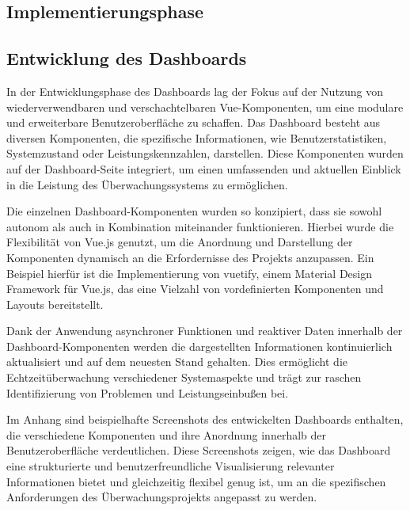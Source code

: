 \begin{flushleft}
	\section{Implementierungsphase}


		\subsection{Entwicklung des Dashboards}
			In der Entwicklungsphase des Dashboards lag der Fokus auf der Nutzung von wiederverwendbaren und verschachtelbaren Vue-Komponenten, um eine modulare und erweiterbare Benutzeroberfläche zu schaffen. Das Dashboard besteht aus diversen Komponenten, die spezifische Informationen, wie Benutzerstatistiken, Systemzustand oder Leistungskennzahlen, darstellen. Diese Komponenten wurden auf der Dashboard-Seite integriert, um einen umfassenden und aktuellen Einblick in die Leistung des Überwachungssystems zu ermöglichen.

			Die einzelnen Dashboard-Komponenten wurden so konzipiert, dass sie sowohl autonom als auch in Kombination miteinander funktionieren. Hierbei wurde die Flexibilität von Vue.js genutzt, um die Anordnung und Darstellung der Komponenten dynamisch an die Erfordernisse des Projekts anzupassen. Ein Beispiel hierfür ist die Implementierung von vuetify, einem Material Design Framework für Vue.js, das eine Vielzahl von vordefinierten Komponenten und Layouts bereitstellt.

			Dank der Anwendung asynchroner Funktionen und reaktiver Daten innerhalb der Dashboard-Komponenten werden die dargestellten Informationen kontinuierlich aktualisiert und auf dem neuesten Stand gehalten. Dies ermöglicht die Echtzeitüberwachung verschiedener Systemaspekte und trägt zur raschen Identifizierung von Problemen und Leistungseinbußen bei.

			Im Anhang sind beispielhafte Screenshots des entwickelten Dashboards enthalten, die verschiedene Komponenten und ihre Anordnung innerhalb der Benutzeroberfläche verdeutlichen. Diese Screenshots zeigen, wie das Dashboard eine strukturierte und benutzerfreundliche Visualisierung relevanter Informationen bietet und gleichzeitig flexibel genug ist, um an die spezifischen Anforderungen des Überwachungsprojekts angepasst zu werden.


\end{flushleft}
